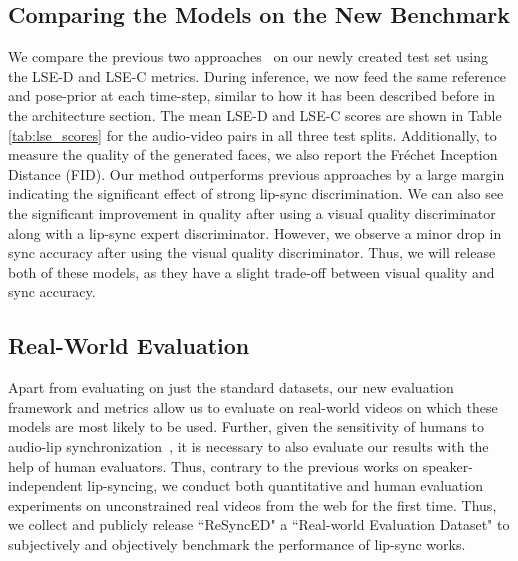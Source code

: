 \documentclass[sigconf]{acmart}
\begin{document}
\subsection{Comparing the Models on the New Benchmark}
We compare the previous two approaches~\cite{kr2019towards,jamaludin2019you} on our newly created test set using the LSE-D and LSE-C metrics. During inference, we now feed the same reference and pose-prior at each time-step, similar to how it has been described before in the architecture section. The mean LSE-D and LSE-C scores are shown in Table \ref{tab:lse_scores} for the audio-video pairs in all three test splits. Additionally, to measure the quality of the generated faces, we also report the Fréchet Inception Distance (FID). Our method outperforms previous approaches by a large margin indicating the significant effect of strong lip-sync discrimination. We can also see the significant improvement in quality after using a visual quality discriminator along with a lip-sync expert discriminator. However, we observe a minor drop in sync accuracy after using the visual quality discriminator. Thus, we will release both of these models, as they have a slight trade-off between visual quality and sync accuracy.

\subsection{Real-World Evaluation}
Apart from evaluating on just the standard datasets, our new evaluation framework and metrics allow us to evaluate on real-world videos on which these models are most likely to be used. Further, given the sensitivity of humans to audio-lip synchronization~\cite{Chung16a}, it is necessary to also evaluate our results with the help of human evaluators. Thus, contrary to the previous works on speaker-independent lip-syncing, we conduct both quantitative and human evaluation experiments on unconstrained real videos from the web for the first time. Thus, we collect and publicly release ``ReSyncED" a ``Real-world Evaluation Dataset" to subjectively and objectively benchmark the performance of lip-sync works. 
\end{document}

